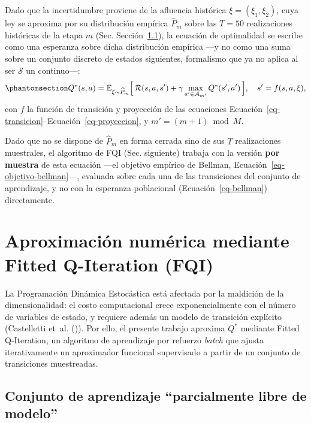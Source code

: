 \documentclass[
  spanish,
  letterpaper,
]{scrreprt}
\theoremstyle{definition}
\theoremstyle{remark}
\begin{document}
Dado que la incertidumbre proviene de la afluencia histórica
\(\xi=(\xi_1,\xi_2)\), cuya ley se aproxima por su distribución empírica
\(\widehat P_m\) sobre las \(T=50\) realizaciones históricas de la etapa
\(m\) (Sec. Sección~\ref{sec-conjunto-aprendizaje}), la ecuación de
optimalidad se escribe como una esperanza sobre dicha distribución
empírica ---y no como una suma sobre un conjunto discreto de estados
siguientes, formalismo que ya no aplica al ser \(\mathcal S\) un
continuo---:
\begin{equation}\protect\phantomsection\label{eq-bellman}{Q^{*}(s,a) = \mathbb{E}_{\xi\sim\widehat P_m}\Big[\,\mathcal R(s,a,s') + \gamma\max_{a'\in\mathcal A_{m'}} Q^{*}(s',a')\,\Big], \quad s' = f(s,a,\xi),}\end{equation}
con \(f\) la función de transición y proyección de las ecuaciones
Ecuación~\ref{eq-transicion}--Ecuación~\ref{eq-proyeccion}, y
\(m'=(m+1)\bmod M\).

Dado que no se dispone de \(\widehat P_m\) en forma cerrada sino de sus
\(T\) realizaciones muestrales, el algoritmo de FQI (Sec. siguiente)
trabaja con la versión \textbf{por muestra} de esta ecuación ---el
objetivo empírico de Bellman, Ecuación~\ref{eq-objetivo-bellman}---,
evaluada sobre cada una de las transiciones del conjunto de aprendizaje,
y no con la esperanza poblacional (Ecuación~\ref{eq-bellman})
directamente.

\section{Aproximación numérica mediante Fitted Q-Iteration
(FQI)}\label{aproximaciuxf3n-numuxe9rica-mediante-fitted-q-iteration-fqi}

La Programación Dinámica Estocástica está afectada por la maldición de
la dimensionalidad: el costo computacional crece exponencialmente con el
número de variables de estado, y requiere además un modelo de transición
explícito (Castelletti et~al. ()).
Por ello, el presente trabajo aproxima \(Q^*\) mediante Fitted
Q-Iteration, un algoritmo de aprendizaje por refuerzo \emph{batch} que
ajusta iterativamente un aproximador funcional supervisado a partir de
un conjunto de transiciones muestreadas.

\subsection{Conjunto de aprendizaje ``parcialmente libre de
modelo''}\label{sec-conjunto-aprendizaje}
\end{document}

